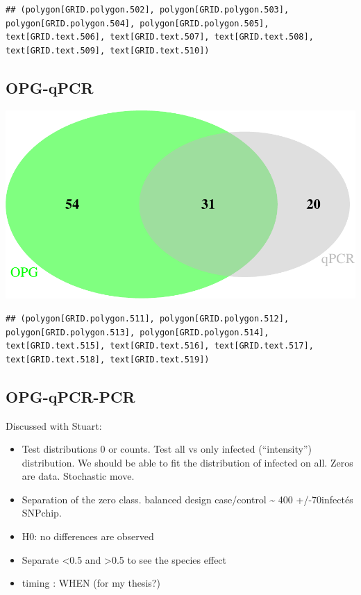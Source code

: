 \documentclass[]{article}
\providecommand{\tightlist}{%
  \setlength{\itemsep}{0pt}\setlength{\parskip}{0pt}}
\begin{document}
\begin{verbatim}
## (polygon[GRID.polygon.502], polygon[GRID.polygon.503], polygon[GRID.polygon.504], polygon[GRID.polygon.505], text[GRID.text.506], text[GRID.text.507], text[GRID.text.508], text[GRID.text.509], text[GRID.text.510])
\end{verbatim}

\subsection{OPG-qPCR}\label{opg-qpcr}

\includegraphics{Data_Analysis_Alice_files/figure-latex/opgpcrVenn-1.pdf}

\begin{verbatim}
## (polygon[GRID.polygon.511], polygon[GRID.polygon.512], polygon[GRID.polygon.513], polygon[GRID.polygon.514], text[GRID.text.515], text[GRID.text.516], text[GRID.text.517], text[GRID.text.518], text[GRID.text.519])
\end{verbatim}

\subsection{OPG-qPCR-PCR}\label{opg-qpcr-pcr}

Discussed with Stuart:

\begin{itemize}
\tightlist
\item
  Test distributions 0 or counts. Test all vs only infected
  (``intensity'') distribution. We should be able to fit the
  distribution of infected on all. Zeros are data. Stochastic move.
\item
  Separation of the zero class. balanced design case/control
  \textasciitilde{} 400 +/-70infectés SNPchip.
\item
  H0: no differences are observed
\item
  Separate \textless{}0.5 and \textgreater{}0.5 to see the species
  effect
\item
  timing : WHEN (for my thesis?)
\end{itemize}
\end{document}
